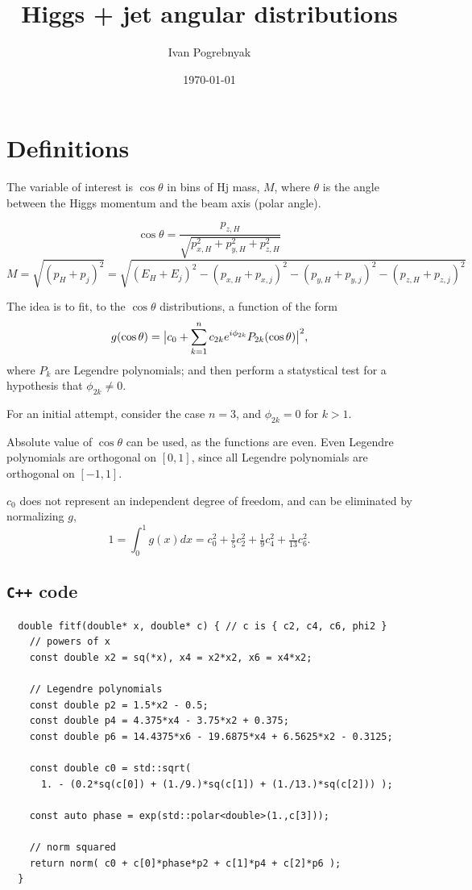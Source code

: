 \documentclass[12pt]{article}
\title{Higgs + jet angular distributions}
\author{Ivan Pogrebnyak}
\date{\today}
\begin{document}
\maketitle


\section{Definitions}
The variable of interest is $\cos\theta$ in bins of Hj mass, $M$, where
$\theta$ is the angle between the Higgs momentum and the beam axis (polar angle).

\begin{equation}
  \cos\theta = \frac{p_{z,H}}{ \sqrt{p_{x,H}^2+p_{y,H}^2+p_{z,H}^2} }
\end{equation}
\begin{equation}
  M = \sqrt{(p_H + p_j)^2}
  = \sqrt{(E_H+E_j)^2-(p_{x,H}+p_{x,j})^2-(p_{y,H}+p_{y,j})^2-(p_{z,H}+p_{z,j})^2}
\end{equation}

The idea is to fit, to the $\cos\theta$ distributions, a function of the form
\begin{equation}
  g(\cos\theta) = \big|c_0 + \sum_{k=1}^{n}c_{2k}e^{i\phi_{2k}}P_{2k}(\cos\theta)\big|^2,
\end{equation}
where $P_k$ are Legendre polynomials;
and then perform a statystical test for a hypothesis that $\phi_{2k}\neq0$.

For an initial attempt, consider the case $n=3$, and $\phi_{2k}=0$ for $k>1$.

Absolute value of $\cos\theta$ can be used, as the functions are even.
Even Legendre polynomials are orthogonal on $[0,1]$, since all Legendre
polynomials are orthogonal on $[-1,1]$.

$c_0$ does not represent an independent degree of freedom, and can be
eliminated by normalizing $g$,
\begin{equation}
  1 = \int_0^1 g(x) dx = c_0^2 + \tfrac{1}{5}c_2^2 + \tfrac{1}{9}c_4^2 + \tfrac{1}{13}c_6^2.
\end{equation}

\subsection{\texorpdfstring{\texttt{C++}}{C++} code}
\begin{verbatim}
  double fitf(double* x, double* c) { // c is { c2, c4, c6, phi2 }
    // powers of x
    const double x2 = sq(*x), x4 = x2*x2, x6 = x4*x2;

    // Legendre polynomials
    const double p2 = 1.5*x2 - 0.5;
    const double p4 = 4.375*x4 - 3.75*x2 + 0.375;
    const double p6 = 14.4375*x6 - 19.6875*x4 + 6.5625*x2 - 0.3125;

    const double c0 = std::sqrt(
      1. - (0.2*sq(c[0]) + (1./9.)*sq(c[1]) + (1./13.)*sq(c[2])) );

    const auto phase = exp(std::polar<double>(1.,c[3]));

    // norm squared
    return norm( c0 + c[0]*phase*p2 + c[1]*p4 + c[2]*p6 );
  }
\end{verbatim}
\end{document}
